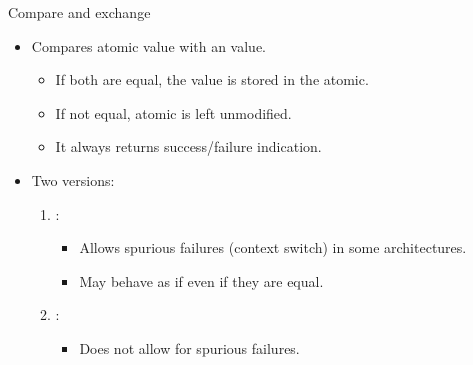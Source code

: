 \begin{frame}[t,fragile]{Compare and exchange}
\begin{itemize}
  \item Compares atomic value with an  value.
    \begin{itemize}
      \item If both are equal, the  value is stored in the atomic.
      \item If not equal, atomic is left unmodified.
      \item It always returns success/failure indication.
    \end{itemize}

  \item Two versions:
    \begin{enumerate}
      \item {}:
        \begin{itemize}
          \item Allows spurious failures (context switch) in some architectures.
          \item May behave as if \cppid{*} even if they are equal.
        \end{itemize}
      \item {}:
        \begin{itemize}
          \item Does not allow for spurious failures.
        \end{itemize}
    \end{enumerate}
\end{itemize}
\end{frame}

